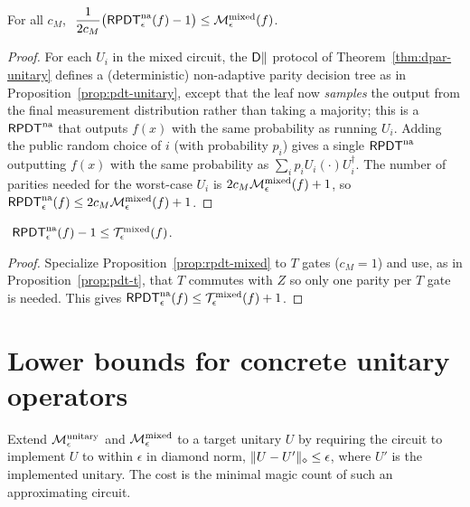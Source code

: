 \begin{proposition}
  \label{prop:rpdt-mixed}
  For all $c_M$, $\ \dfrac{1}{2c_M}\big(\mathsf{RPDT}^{\mathrm{na}}_\epsilon(f) - 1\big) \le
  \mathcal{M}^{\mathrm{mixed}}_\epsilon(f)$.
\end{proposition}
\begin{proof}
  For each $U_i$ in the mixed circuit, the $\mathsf{D}\|$ protocol of
  Theorem~\ref{thm:dpar-unitary} defines a (deterministic) non-adaptive parity
  decision tree as in Proposition~\ref{prop:pdt-unitary}, except that the leaf now
  \emph{samples} the output from the final measurement distribution rather than
  taking a majority; this is a $\mathsf{RPDT}^{\mathrm{na}}$ that outputs $f(x)$ with the same
  probability as running $U_i$. Adding the public random choice of $i$ (with
  probability $p_i$) gives a single $\mathsf{RPDT}^{\mathrm{na}}$ outputting $f(x)$ with the same
  probability as $\sum_i p_i U_i(\cdot)U_i^\dagger$. The number of parities needed
  for the worst-case $U_i$ is $2c_M\mathcal{M}^{\mathrm{mixed}}_\epsilon(f) + 1$, so
  $\mathsf{RPDT}^{\mathrm{na}}_\epsilon(f) \le 2c_M\mathcal{M}^{\mathrm{mixed}}_\epsilon(f) + 1$.
\end{proof}

\begin{proposition}
  \label{prop:rpdt-t}
  $\ \mathsf{RPDT}^{\mathrm{na}}_\epsilon(f) - 1 \le \mathcal{T}^{\mathrm{mixed}}_\epsilon(f)$.
\end{proposition}
\begin{proof}
  Specialize Proposition~\ref{prop:rpdt-mixed} to $T$ gates ($c_M=1$) and use, as
  in Proposition~\ref{prop:pdt-t}, that $T$ commutes with $Z$ so only one parity
  per $T$ gate is needed. This gives $\mathsf{RPDT}^{\mathrm{na}}_\epsilon(f) \le \mathcal{T}^{\mathrm{mixed}}_\epsilon(f) +
  1$.
\end{proof}

\section{Lower bounds for concrete unitary operators}

\begin{definition}
  \label{def:magic-operator}
  Extend $\mathcal{M}^{\mathrm{unitary}}_\epsilon$ and $\mathcal{M}^{\mathrm{mixed}}_\epsilon$ to a target unitary $U$ by requiring
  the circuit to implement $U$ to within $\epsilon$ in diamond norm,
  $\lVert U-U' \rVert_{\diamond}\le\epsilon$, where $U'$ is the implemented unitary. The cost is
  the minimal magic count of such an approximating circuit.
\end{definition}

